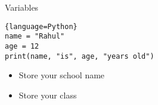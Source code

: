 \begin{frame}[fragile]{Variables}
	\begin{lstlisting}{language=Python}
name = "Rahul"
age = 12
print(name, "is", age, "years old")
    \end{lstlisting}
    \pause
	\begin{itemize}
		\item Store your school name
		\item Store your class
	\end{itemize}
\end{frame}